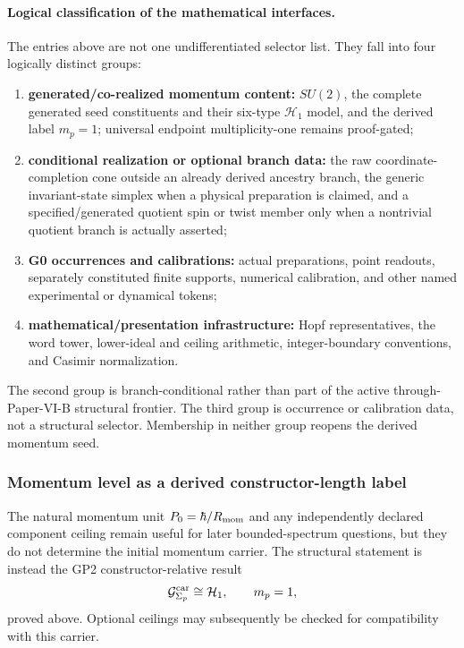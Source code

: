 \documentclass[12pt,a4paper]{article}
\begin{document}
\paragraph{Logical classification of the mathematical interfaces.}
The entries above are not one undifferentiated selector list.  They fall into
four logically distinct groups:
\begin{enumerate}[label=(\arabic*), leftmargin=2.2em]
\item \textbf{generated/co-realized momentum content:}
\(SU(2)\), the complete generated seed constituents and their
six-type \(\mathcal H_1\) model, and the derived label \(m_p=1\);
universal endpoint multiplicity-one remains proof-gated;
\item \textbf{conditional realization or optional branch data:}
the raw coordinate-completion cone outside an already derived ancestry
branch, the generic invariant-state simplex when a physical preparation is
claimed, and a specified/generated quotient spin or twist member only when a
nontrivial quotient branch is actually asserted;
\item \textbf{G0 occurrences and calibrations:}
actual preparations, point readouts, separately constituted finite supports,
numerical calibration, and other named experimental or dynamical tokens;
\item \textbf{mathematical/presentation infrastructure:}
Hopf representatives, the word tower, lower-ideal and ceiling arithmetic,
integer-boundary conventions, and Casimir normalization.
\end{enumerate}
The second group is branch-conditional rather than part of the active
through-Paper-VI-B structural frontier.  The third group is occurrence or
calibration data, not a structural selector.  Membership in neither group
reopens the derived momentum seed.

\subsubsection{Momentum level as a derived constructor-length label}
\label{p2:subsec:m1-kinematic}
The natural momentum unit \(P_{0}=\hbar/R_{\mathrm{mom}}\) and any independently
declared component ceiling remain useful for later bounded-spectrum questions,
but they do not determine the initial momentum carrier.  The structural
statement is instead the GP2 constructor-relative result
\[
 \mathcal G^{\rm car}_{\Sigma_p}\cong\mathcal H_1,
 \qquad
 m_p=1,
\]
proved above.  Optional ceilings may subsequently be checked for compatibility
with this carrier.
\end{document}

